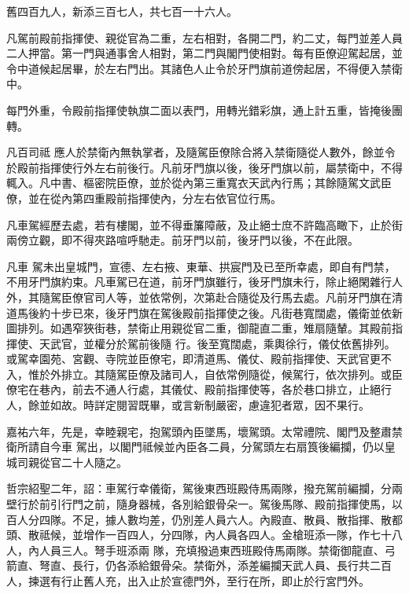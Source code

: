 \begin{pinyinscope}
 舊四百九人，新添三百七人，共七百一十六人。



 凡駕前殿前指揮使、親從官為二重，左右相對，各開二門，約二丈，每門並差人員二人押當。第一門與通事舍人相對，第二門與閣門使相對。每有臣僚迎駕起居，並令中道候起居畢，於左右門出。其諸色人止令於牙門旗前道傍起居，不得便入禁衛中。



 每門外重，令殿前指揮使執旗二面以表門，用轉光錯彩旗，通上計五重，皆掩後團轉。



 凡百司祗
 應人於禁衛內無執掌者，及隨駕臣僚除合將入禁衛隨從人數外，餘並令於殿前指揮使行外左右前後行。凡前牙門旗以後，後牙門旗以前，屬禁衛中，不得輒入。凡中書、樞密院臣僚，並於從內第三重寬衣天武內行馬；其餘隨駕文武臣僚，並在從內第四重殿前指揮使內，分左右依官位行馬。



 凡車駕經歷去處，若有樓閣，並不得垂簾障蔽，及止絕士庶不許臨高瞰下，止於街兩傍立觀，即不得夾路喧呼馳走。前牙門以前，後牙門以後，不在此限。



 凡車
 駕未出皇城門，宣德、左右掖、東華、拱宸門及已至所幸處，即自有門禁，不用牙門旗約束。凡車駕已在道，前牙門旗雖行，後牙門旗未行，除止絕閑雜行人外，其隨駕臣僚官司人等，並依常例，次第赴合隨從及行馬去處。凡前牙門旗在清道馬後約十步已來，後牙門旗在駕後殿前指揮使之後。凡街巷寬闊處，儀衛並依新圖排列。如遇窄狹街巷，禁衛止用親從官二重，御龍直二重，雉扇隨輦。其殿前指揮使、天武官，並權分於駕前後隨
 行。後至寬闊處，乘輿徐行，儀仗依舊排列。或駕幸園苑、宮觀、寺院並臣僚宅，即清道馬、儀仗、殿前指揮使、天武官更不入，惟於外排立。其隨駕臣僚及諸司人，自依常例隨從，候駕行，依次排列。或臣僚宅在巷內，前去不通人行處，其儀仗、殿前指揮使等，各於巷口排立，止絕行人，餘並如故。時詳定閱習既畢，或言新制嚴密，慮違犯者眾，因不果行。



 嘉祐六年，先是，幸睦親宅，抱駕頭內臣墜馬，壞駕頭。太常禮院、閣門及整肅禁衛所請自今車
 駕出，以閣門祗候並內臣各二員，分駕頭左右扇筤後編攔，仍以皇城司親從官二十人隨之。



 哲宗紹聖二年，詔：車駕行幸儀衛，駕後東西班殿侍馬兩隊，撥充駕前編攔，分兩壁行於前引行門之前，隨身器械，各別給銀骨朵一。駕後馬隊、殿前指揮使馬，以百人分四隊。不足，據人數均差，仍別差人員六人。內殿直、散員、散指揮、散都頭、散祗候，並增作一百四人，分四隊，內人員各四人。金槍班添一隊，作七十八人，內人員三人。弩手班添兩
 隊，充填撥過東西班殿侍馬兩隊。禁衛御龍直、弓箭直、弩直、長行，仍各添給銀骨朵。禁衛外，添差編攔天武人員、長行共二百人，揀選有行止舊人充，出入止於宣德門外，至行在所，即止於行宮門外。




\end{pinyinscope}
